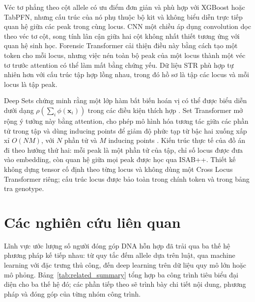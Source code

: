 \documentclass[12pt,a4paper]{article}
\begin{document}
Véc tơ phẳng theo cột allele có ưu điểm đơn giản và phù hợp với XGBoost hoặc TabPFN, nhưng cấu trúc của nó phụ thuộc bộ kit và không biểu diễn trực tiếp quan hệ giữa các peak trong cùng locus. CNN một chiều áp dụng convolution dọc theo véc tơ cột, song tính lân cận giữa hai cột không nhất thiết tương ứng với quan hệ sinh học. Forensic Transformer cải thiện điều này bằng cách tạo một token cho mỗi locus, nhưng việc nén toàn bộ peak của một locus thành một véc tơ trước attention có thể làm mất bằng chứng yếu. Dữ liệu STR phù hợp tự nhiên hơn với cấu trúc tập hợp lồng nhau, trong đó hồ sơ là tập các locus và mỗi locus là tập peak.

Deep Sets chứng minh rằng một lớp hàm bất biến hoán vị có thể được biểu diễn dưới dạng \(\rho(\sum_i\phi(\bm{x}_i))\) trong các điều kiện thích hợp \cite{zaheer2017}. Set Transformer mở rộng ý tưởng này bằng attention, cho phép mô hình hóa tương tác giữa các phần tử trong tập và dùng inducing points để giảm độ phức tạp từ bậc hai xuống xấp xỉ \(O(NM)\), với \(N\) phần tử và \(M\) inducing points \cite{lee2019}. Kiến trúc thực tế của đồ án đi theo hướng thứ hai: mỗi peak là một phần tử của tập, chỉ số locus được đưa vào embedding, còn quan hệ giữa mọi peak được học qua ISAB++. Thiết kế không dựng tensor cố định theo từng locus và không dùng một Cross Locus Transformer riêng; cấu trúc locus được bảo toàn trong chính token và trong bảng tra genotype.

\section{Các nghiên cứu liên quan}

Lĩnh vực ước lượng số người đóng góp DNA hỗn hợp đã trải qua ba thế hệ phương pháp kế tiếp nhau: từ quy tắc đếm allele dựa trên luật, qua machine learning với đặc trưng thủ công, đến deep learning trên dữ liệu quy mô lớn hoặc mô phỏng. Bảng~\ref{tab:related_summary} tổng hợp ba công trình tiêu biểu đại diện cho ba thế hệ đó; các phần tiếp theo sẽ trình bày chi tiết nội dung, phương pháp và đóng góp của từng nhóm công trình.
\end{document}

